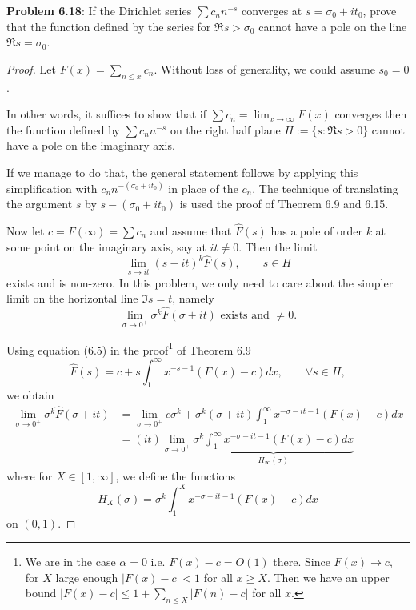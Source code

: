 \documentclass[12pt]{article}
\newcommand{\Fhat}{\widehat{F}}
\begin{document}
\fi

\textbf{Problem 6.18}: If the Dirichlet series $\sum c_n n^{-s}$ converges at $s = \sigma_0 + i t_0$, prove that the function defined by the series for $\Re s > \sigma_0$ cannot have a pole on the line $\Re s = \sigma_0$.

\begin{proof}
Let $F(x) = \sum_{n \leq x} c_n$. Without loss of generality, we could assume $s_0 = 0$.

In other words, it suffices to show that if $\sum c_n = \lim_{x \rightarrow \infty} F(x)$ converges then the function defined by $\sum c_n n^{-s}$ on the right half plane $H := \{s : \Re s > 0\}$ cannot have a pole on the imaginary axis.

If we manage to do that, the general statement follows by applying this simplification with $c_n n^{-(\sigma_0 + i t_0)}$ in place of the $c_n$. The technique of translating the argument $s$ by $s - (\sigma_0 + i t_0)$ is used the proof of Theorem 6.9 and 6.15.

Now let $c = F(\infty) = \sum c_n$ and assume that $\Fhat(s)$ has a pole of order $k$ at some point on the imaginary axis, say at $i t \not= 0$. Then the limit
$$\lim_{s \rightarrow i t} (s - i t)^k \Fhat(s), \qquad s \in H$$
exists and is non-zero. In this problem, we only need to care about the simpler limit on the horizontal line $\Im s = t$, namely
$$\lim_{\sigma \rightarrow 0^+} \sigma^k \Fhat(\sigma + i t)  \text{ exists and } \not= 0.$$

Using equation (6.5) in the proof\footnote{We are in the case $\alpha = 0$ i.e. $F(x) - c = O(1)$ there. Since $F(x) \rightarrow c$, for $X$ large enough $|F(x) - c| < 1$ for all $x \geq X$. Then we have an upper bound $|F(x) - c| \leq 1 + \sum_{n \leq X} |F(n) - c|$ for all $x$.} of Theorem 6.9
$$\Fhat(s) = c + s \int_1^\infty x^{-s-1} (F(x) - c) dx, \qquad \forall s \in H,$$
we obtain
\begin{align*}
\lim_{\sigma \rightarrow 0^+} \sigma^k \Fhat(\sigma + i t)
&= \lim_{\sigma \rightarrow 0^+} c \sigma^k + \sigma^k (\sigma + i t) \int_1^\infty x^{-\sigma - i t - 1} (F(x) - c) dx\\
&= (it) \lim_{\sigma \rightarrow 0^+} \underbrace{\sigma^k \int_1^\infty x^{-\sigma - i t - 1} (F(x) - c) dx}_{H_\infty(\sigma)}
\end{align*}
where for $X \in [1, \infty]$, we define the functions
$$H_X(\sigma) = \sigma^k \int_1^X x^{-\sigma - i t -1} (F(x) - c) dx$$
on $(0, 1)$.


\end{proof}
\end{document}

